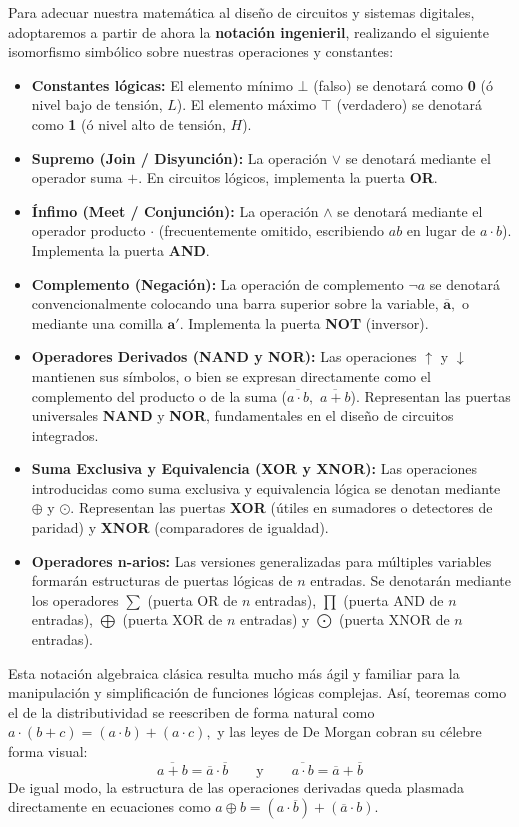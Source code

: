 Para adecuar nuestra matemática al diseño de circuitos y sistemas digitales, adoptaremos a partir de ahora la \textbf{notación ingenieril}, realizando el siguiente isomorfismo simbólico sobre nuestras operaciones y constantes:
\begin{itemize}
    \item \textbf{Constantes lógicas:} El elemento mínimo $\bot$ (falso) se denotará como \textbf{0} (ó nivel bajo de tensión, $L$). El elemento máximo $\top$ (verdadero) se denotará como \textbf{1} (ó nivel alto de tensión, $H$).
    \item \textbf{Supremo (Join / Disyunción):} La operación $\vee$ se denotará mediante el operador suma $\mathbf{+}.$ En circuitos lógicos, implementa la puerta \textbf{OR}.
    \item \textbf{Ínfimo (Meet / Conjunción):} La operación $\wedge$ se denotará mediante el operador producto $\mathbf{\cdot}$ (frecuentemente omitido, escribiendo $ab$ en lugar de $a \cdot b$). Implementa la puerta \textbf{AND}.
    \item \textbf{Complemento (Negación):} La operación de complemento $\neg a$ se denotará convencionalmente colocando una barra superior sobre la variable, $\mathbf{\overline{a}},$ o mediante una comilla $\mathbf{a'}.$ Implementa la puerta \textbf{NOT} (inversor).
    \item \textbf{Operadores Derivados (NAND y NOR):} Las operaciones $\uparrow$ y $\downarrow$ mantienen sus símbolos, o bien se expresan directamente como el complemento del producto o de la suma ($\overline{a \cdot b},$ $\overline{a+b}$). Representan las puertas universales \textbf{NAND} y \textbf{NOR}, fundamentales en el diseño de circuitos integrados.
    \item \textbf{Suma Exclusiva y Equivalencia (XOR y XNOR):} Las operaciones introducidas como suma exclusiva y equivalencia lógica se denotan mediante $\mathbf{\oplus}$ y $\mathbf{\odot}.$ Representan las puertas \textbf{XOR} (útiles en sumadores o detectores de paridad) y \textbf{XNOR} (comparadores de igualdad).
    \item \textbf{Operadores n-arios:} Las versiones generalizadas para múltiples variables formarán estructuras de puertas lógicas de $n$ entradas. Se denotarán mediante los operadores $\sum$ (puerta OR de $n$ entradas), $\prod$ (puerta AND de $n$ entradas), $\bigoplus$ (puerta XOR de $n$ entradas) y $\bigodot$ (puerta XNOR de $n$ entradas).
\end{itemize}

Esta notación algebraica clásica resulta mucho más ágil y familiar para la manipulación y simplificación de funciones lógicas complejas. Así, teoremas como el de la distributividad se reescriben de forma natural como $a \cdot (b + c) = (a \cdot b) + (a \cdot c),$ y las leyes de De Morgan cobran su célebre forma visual:
\[ \overline{a + b} = \overline{a} \cdot \overline{b} \qquad \text{y} \qquad \overline{a \cdot b} = \overline{a} + \overline{b} \]
De igual modo, la estructura de las operaciones derivadas queda plasmada directamente en ecuaciones como $a \oplus b = (a \cdot \overline{b}) + (\overline{a} \cdot b).$

